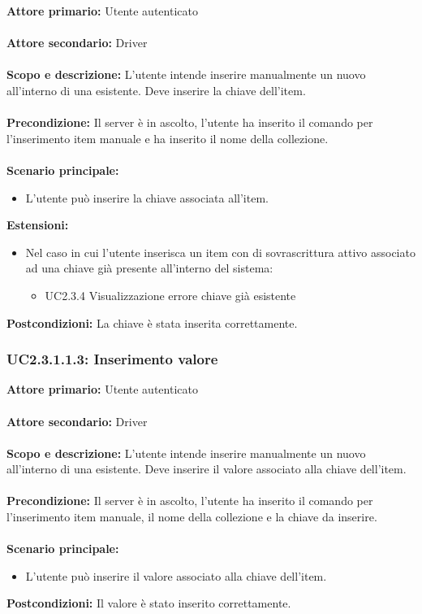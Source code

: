 \documentclass{scalatekids-article}
\begin{document}
\textbf{Attore primario:} Utente autenticato\\ \\
\textbf{Attore secondario:} Driver\\ \\
\textbf{Scopo e descrizione:} L'utente intende inserire manualmente un nuovo  all'interno di una  esistente. Deve inserire la chiave dell'item.\\ \\
\textbf{Precondizione:} Il server è in ascolto, l'utente ha inserito il comando per l'inserimento item manuale e ha inserito il nome della collezione.\\ \\
\textbf{Scenario principale:}
\begin{itemize}
  \item L'utente può inserire la chiave associata all'item.
\end{itemize}
\textbf{Estensioni:}
\begin{itemize}
  \item Nel caso in cui l'utente inserisca un item con  di sovrascrittura attivo associato ad una chiave già presente all'interno del sistema:
  \begin{itemize}
    \item UC2.3.4 Visualizzazione errore chiave già esistente
  \end{itemize}
\end{itemize}
\textbf{Postcondizioni:} La chiave è stata inserita correttamente.

\subsubsection{UC2.3.1.1.3: Inserimento valore}

\textbf{Attore primario:} Utente autenticato\\ \\
\textbf{Attore secondario:} Driver\\ \\
\textbf{Scopo e descrizione:} L'utente intende inserire manualmente un nuovo  all'interno di una  esistente. Deve inserire il valore associato alla chiave dell'item.\\ \\
\textbf{Precondizione:} Il server è in ascolto, l'utente ha inserito il comando per l'inserimento item manuale, il nome della collezione e la chiave da inserire.\\ \\
\textbf{Scenario principale:}
\begin{itemize}
  \item L'utente può inserire il valore associato alla chiave dell'item.
\end{itemize}
\textbf{Postcondizioni:} Il valore è stato inserito correttamente.
\end{document}
